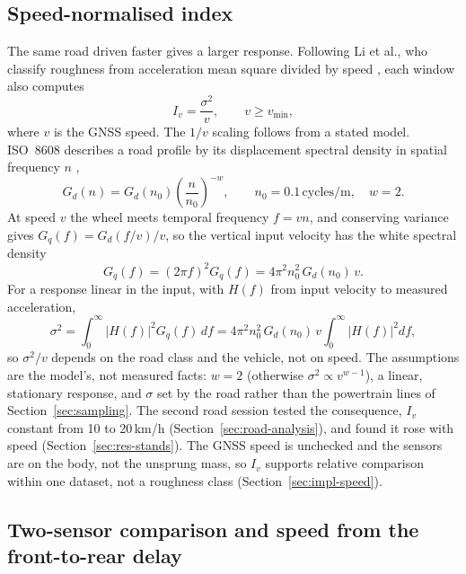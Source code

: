 \subsection{Speed-normalised index}
\label{sec:speed-norm}

The same road driven faster gives a larger response. Following Li et al., who classify roughness from acceleration mean square divided by speed \cite{li2018}, each window also computes
\begin{equation}
I_v = \frac{\sigma^2}{v}, \qquad v \ge v_{\min},
\label{eq:speed-index}
\end{equation}
where $v$ is the GNSS speed. The $1/v$ scaling follows from a stated model. ISO~8608 describes a road profile by its displacement spectral density in spatial frequency $n$ \cite{agostinacchio2014},
\begin{equation}
G_d(n) = G_d(n_0)\left(\frac{n}{n_0}\right)^{-w}, \qquad n_0 = 0.1\,\mathrm{cycles/m}, \quad w = 2.
\label{eq:road-psd}
\end{equation}
At speed $v$ the wheel meets temporal frequency $f = vn$, and conserving variance gives $G_q(f) = G_d(f/v)/v$, so the vertical input velocity has the white spectral density
\begin{equation}
G_{\dot q}(f) = (2\pi f)^2 G_q(f) = 4\pi^2 n_0^2\, G_d(n_0)\, v .
\label{eq:road-velocity}
\end{equation}
For a response linear in the input, with $H(f)$ from input velocity to measured acceleration,
\begin{equation}
\sigma^2 = \int_0^{\infty} \lvert H(f) \rvert^2 G_{\dot q}(f)\,df = 4\pi^2 n_0^2\, G_d(n_0)\, v \int_0^{\infty} \lvert H(f) \rvert^2 df,
\label{eq:iv-derivation}
\end{equation}
so $\sigma^2/v$ depends on the road class and the vehicle, not on speed. The assumptions are the model's, not measured facts: $w = 2$ (otherwise $\sigma^2 \propto v^{w-1}$), a linear, stationary response, and $\sigma$ set by the road rather than the powertrain lines of Section~\ref{sec:sampling}. The second road session tested the consequence, $I_v$ constant from 10 to 20\,km/h (Section~\ref{sec:road-analysis}), and found it rose with speed (Section~\ref{sec:res-stands}). The GNSS speed is unchecked and the sensors are on the body, not the unsprung mass, so $I_v$ supports relative comparison within one dataset, not a roughness class (Section~\ref{sec:impl-speed}).

\subsection{Two-sensor comparison and speed from the front-to-rear delay}
\label{sec:imu-fusion}

